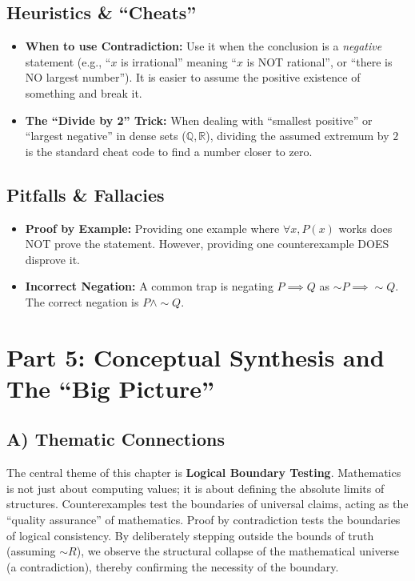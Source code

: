\documentclass[11pt, letterpaper]{article}
\theoremstyle{remark}
\newcommand{\R}{\mathbb{R}}
\newcommand{\Q}{\mathbb{Q}}
\begin{document}
\subsection{Heuristics \& ``Cheats''}
\begin{itemize}
    \item \textbf{When to use Contradiction:} Use it when the conclusion is a \textit{negative} statement (e.g., ``$x$ is irrational'' meaning ``$x$ is NOT rational'', or ``there is NO largest number''). It is easier to assume the positive existence of something and break it.
    \item \textbf{The ``Divide by 2'' Trick:} When dealing with ``smallest positive'' or ``largest negative'' in dense sets ($\Q, \R$), dividing the assumed extremum by $2$ is the standard cheat code to find a number closer to zero.
\end{itemize}

\subsection{Pitfalls \& Fallacies}
\begin{itemize}
    \item \textbf{Proof by Example:} Providing one example where $\forall x, P(x)$ works does NOT prove the statement. However, providing one counterexample DOES disprove it.
    \item \textbf{Incorrect Negation:} A common trap is negating $P \implies Q$ as $\sim P \implies \sim Q$. The correct negation is $P \land \sim Q$.
\end{itemize}

\newpage
\section{Part 5: Conceptual Synthesis and The ``Big Picture''}

\subsection{A) Thematic Connections}
The central theme of this chapter is \textbf{Logical Boundary Testing}. Mathematics is not just about computing values; it is about defining the absolute limits of structures. Counterexamples test the boundaries of universal claims, acting as the ``quality assurance'' of mathematics. Proof by contradiction tests the boundaries of logical consistency. By deliberately stepping outside the bounds of truth (assuming $\sim R$), we observe the structural collapse of the mathematical universe (a contradiction), thereby confirming the necessity of the boundary.
\end{document}
